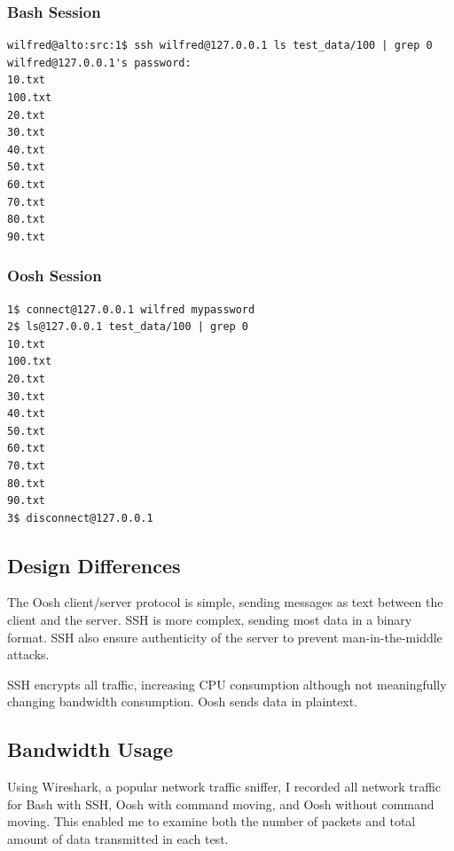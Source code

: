\documentclass[12pt,twoside,notitlepage]{report}
\begin{document}
\subsubsection{Bash Session}
\begin{verbatim}
wilfred@alto:src:1$ ssh wilfred@127.0.0.1 ls test_data/100 | grep 0
wilfred@127.0.0.1's password:
10.txt
100.txt
20.txt
30.txt
40.txt
50.txt
60.txt
70.txt
80.txt
90.txt
\end{verbatim}

\subsubsection{Oosh Session}
\begin{verbatim}
1$ connect@127.0.0.1 wilfred mypassword
2$ ls@127.0.0.1 test_data/100 | grep 0
10.txt
100.txt
20.txt
30.txt
40.txt
50.txt
60.txt
70.txt
80.txt
90.txt
3$ disconnect@127.0.0.1
\end{verbatim}

\subsection{Design Differences}

The Oosh client/server protocol is simple, sending messages as text
between the client and the server. SSH is more complex, sending most
data in a binary format. SSH also ensure authenticity of the server to
prevent man-in-the-middle attacks.

SSH encrypts all traffic, increasing CPU consumption although not
meaningfully changing bandwidth consumption. Oosh sends data in
plaintext.

\subsection{Bandwidth Usage}
Using Wireshark, a popular network traffic sniffer, I recorded all
network traffic for Bash with SSH, Oosh with command moving, and Oosh
without command moving. This enabled me to examine both the number of
packets and total amount of data transmitted in each test.
\end{document}
